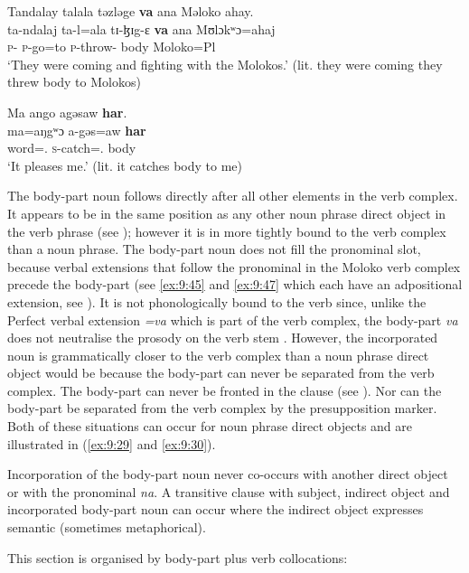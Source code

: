 \ea \label{ex:9:48}
Tandalay  talala  təzləge  \textbf{va} ana  Məloko  ahay.\\
\gll  ta-ndalaj ta-l=ala  tɪ-ɮɪg-ɛ   \textbf{va}  ana  Mʊlɔkʷɔ=ahaj\\
      \textsc{p}-{\PRG}   \textsc{p}-go=to  \textsc{p}-throw-{\CL} body  {\DAT} Moloko=Pl\\
\glt  ‘They were coming and fighting with the Molokos.’ (lit. they were coming they threw body to Molokos)
\z

\ea \label{ex:9:49}
Ma  ango  agəsaw  \textbf{har}.\\
\gll  ma=aŋgʷɔ    a-gəs=aw  \textbf{har}\\
      word={\twoS}.{\POSS}  \textsc{s}-catch={\oneS}.{\IO}  body\\
\glt  ‘It pleases me.’ (lit. it catches body to me)
\z

The body-part noun follows directly after all other elements in the verb complex. It appears to be in the same position as any other noun phrase direct object in the verb phrase (see ); however it is in more tightly bound to the verb complex than a noun phrase. The body-part noun does not fill the \DO pronominal slot, because verbal extensions that follow the \DO pronominal in the Moloko verb complex precede the body-part (see \ref{ex:9:45} and \ref{ex:9:47} which each have an adpositional extension, see ). It is not phonologically bound to the verb since, unlike the Perfect verbal extension \textit{=va} which is part of the verb complex, the body-part \textit{va} does not neutralise the prosody on the verb stem . However, the incorporated noun is grammatically closer to the verb complex than a noun phrase direct object would be because the body-part can never be separated from the verb complex. The body-part can never be fronted in the clause (see ). Nor can the body-part be separated from the verb complex by the presupposition marker. Both of these situations can occur for noun phrase direct objects and are illustrated in  (\ref{ex:9:29} and \ref{ex:9:30}). 

Incorporation of the body-part noun never co-occurs with another direct object or with the \DO pronominal \textit{na}. A transitive clause with subject, indirect object and incorporated body-part noun can occur where the indirect object expresses semantic \LOC (sometimes metaphorical).

This section is organised by body-part plus verb collocations:

